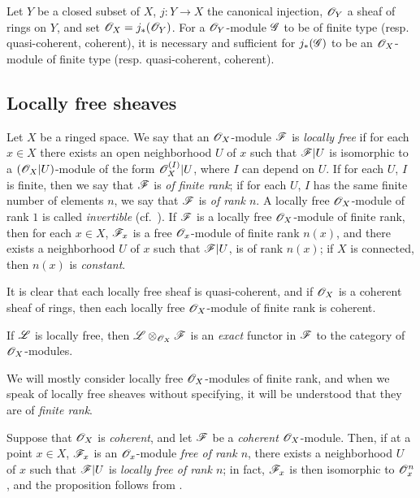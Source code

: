 \begin{env}[5.3.12]
\label{0.5.3.12}
Let $Y$ be a closed subset of $X$, $j:Y\to X$ the canonical injection, $\mathscr{O}_Y$ a sheaf of rings on $Y$, and set $\mathscr{O}_X=j_*(\mathscr{O}_Y)$.
For a $\mathscr{O}_Y$-module $\mathscr{G}$ to be of finite type (resp. quasi-coherent, coherent), it is necessary and sufficient for $j_*(\mathscr{G})$ to be an $\mathscr{O}_X$-module of finite type (resp. quasi-coherent, coherent).
\end{env}

\subsection{Locally free sheaves}
\label{subsection:locally-free-sheaves}

\begin{env}[5.4.1]
\label{0.5.4.1}
Let $X$ be a ringed space.
We say that an $\mathscr{O}_X$-module $\mathscr{F}$ is \emph{locally free} if for each $x\in X$ there exists an open neighborhood $U$ of $x$ such that $\mathscr{F}|U$ is isomorphic to a $(\mathscr{O}_X|U)$-module of the form $\mathscr{O}_X^{(I)}|U$, where $I$ can depend on $U$.
If for each $U$, $I$ is finite, then we say that $\mathscr{F}$ is \emph{of finite rank};
if for each $U$, $I$ has the same finite number of elements $n$, we say that $\mathscr{F}$ is \emph{of rank $n$}.
A locally free $\mathscr{O}_X$-module of rank $1$ is called \emph{invertible} (cf.~).
If $\mathscr{F}$ is a locally free $\mathscr{O}_X$-module of finite rank, then for each $x\in X$, $\mathscr{F}_x$ is a free $\mathscr{O}_x$-module of finite rank $n(x)$, and there exists a neighborhood $U$ of $x$ such that $\mathscr{F}|U$, is of rank $n(x)$;
if $X$ is connected, then $n(x)$ is \emph{constant}.

It is clear that each locally free sheaf is quasi-coherent, and if $\mathscr{O}_X$ is a coherent sheaf of rings, then each locally free $\mathscr{O}_X$-module of finite rank is coherent.

If $\mathscr{L}$ is locally free, then $\mathscr{L}\otimes_{\mathscr{O}_X}\mathscr{F}$ is an \emph{exact} functor in $\mathscr{F}$ to the category of $\mathscr{O}_X$-modules.

We will mostly consider locally free $\mathscr{O}_X$-modules of finite rank,
and when we speak of locally free sheaves without specifying, it will be understood that they are of \emph{finite rank}.

Suppose that $\mathscr{O}_X$ is \emph{coherent}, and let $\mathscr{F}$ be a \emph{coherent} $\mathscr{O}_X$-module.
Then, if at a point $x\in X$, $\mathscr{F}_x$ is an $\mathscr{O}_x$-module \emph{free of rank $n$}, there exists a neighborhood $U$ of $x$ such that $\mathscr{F}|U$ is \emph{locally free of rank $n$};
in fact, $\mathscr{F}_x$ is then isomorphic to $\mathscr{O}_x^n$, and the proposition follows from .
\end{env}


